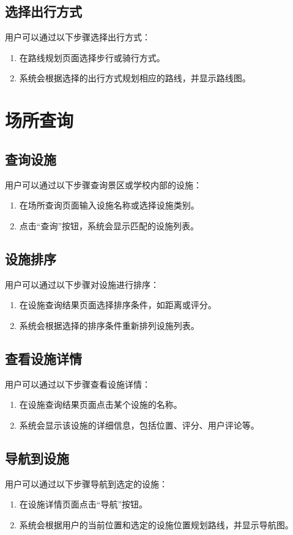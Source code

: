 \documentclass{ctexart}
\begin{document}
\subsection{选择出行方式}
用户可以通过以下步骤选择出行方式：
\begin{enumerate}
    \item 在路线规划页面选择步行或骑行方式。
    \item 系统会根据选择的出行方式规划相应的路线，并显示路线图。
\end{enumerate}

\section{场所查询}

\subsection{查询设施}
用户可以通过以下步骤查询景区或学校内部的设施：
\begin{enumerate}
    \item 在场所查询页面输入设施名称或选择设施类别。
    \item 点击“查询”按钮，系统会显示匹配的设施列表。
\end{enumerate}

\subsection{设施排序}
用户可以通过以下步骤对设施进行排序：
\begin{enumerate}
    \item 在设施查询结果页面选择排序条件，如距离或评分。
    \item 系统会根据选择的排序条件重新排列设施列表。
\end{enumerate}

\subsection{查看设施详情}
用户可以通过以下步骤查看设施详情：
\begin{enumerate}
    \item 在设施查询结果页面点击某个设施的名称。
    \item 系统会显示该设施的详细信息，包括位置、评分、用户评论等。
\end{enumerate}

\subsection{导航到设施}
用户可以通过以下步骤导航到选定的设施：
\begin{enumerate}
    \item 在设施详情页面点击“导航”按钮。
    \item 系统会根据用户的当前位置和选定的设施位置规划路线，并显示导航图。
\end{enumerate}
\end{document}
